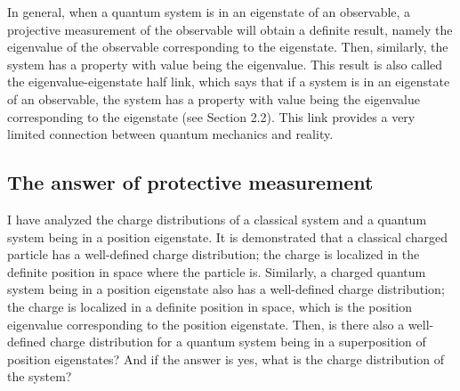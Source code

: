 In general, when a quantum system is in an eigenstate of an observable, a projective measurement of the observable will obtain a definite result, namely the eigenvalue of the observable corresponding to the eigenstate. Then, similarly, the system has a property with value being the eigenvalue. 
This result is also called the eigenvalue-eigenstate half link, which says that if a system is in an eigenstate of an observable, the system has a property with value being the eigenvalue corresponding to the eigenstate (see Section 2.2). This link provides a very limited connection between quantum mechanics and reality.


\subsection{The answer of protective measurement}

I have analyzed the charge distributions of a classical system and a quantum system being in a position eigenstate. %
It is demonstrated that a classical charged particle has a well-defined charge distribution; the charge is localized in the definite position in space where the particle is. Similarly, a charged quantum system being in a position eigenstate also has a well-defined charge distribution; the charge is localized in a definite position in space, which is the position eigenvalue corresponding to the position eigenstate. 
Then, is there also a well-defined charge distribution for a quantum system being in a superposition of position eigenstates? And if the answer is yes, what is the charge distribution of the system? 

